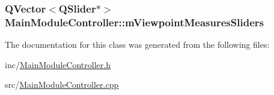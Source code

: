 \hypertarget{class_main_module_controller_a6fef830662ec9bfac61cd9c612ca7bf0}{
\subsubsection[{m\+Viewpoint\+Measures\+Sliders}]{\setlength{\rightskip}{0pt plus 5cm}Q\+Vector$<$Q\+Slider$\ast$$>$ Main\+Module\+Controller\+::m\+Viewpoint\+Measures\+Sliders\hspace{0.3cm}{\ttfamily [private]}}}\label{class_main_module_controller_a6fef830662ec9bfac61cd9c612ca7bf0}


The documentation for this class was generated from the following files\+:\begin{DoxyCompactItemize}
\item 
inc/\hyperlink{_main_module_controller_8h}{Main\+Module\+Controller.\+h}\item 
src/\hyperlink{_main_module_controller_8cpp}{Main\+Module\+Controller.\+cpp}\end{DoxyCompactItemize}
